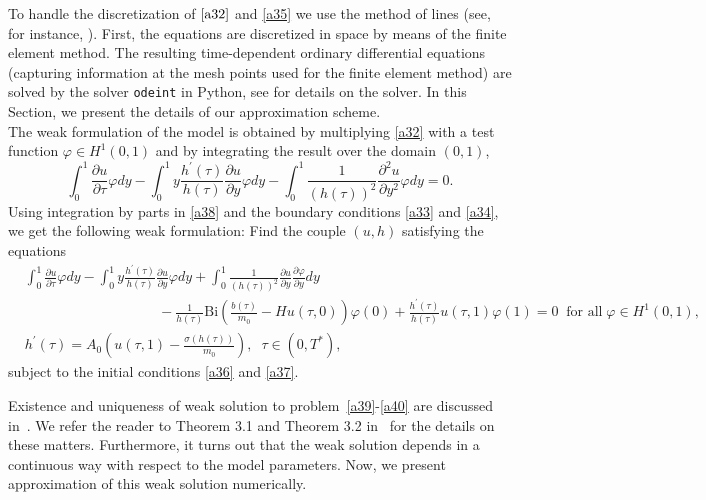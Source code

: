 \documentclass{article}
\begin{document}
To handle  the discretization of $\eqref{a32}$ and \eqref{a35} we use the method of lines (see, for instance, \cite{thomee1984galerkin}). First, the equations are discretized in space by means of the finite element method. The resulting time-dependent ordinary differential equations (capturing information at the mesh points used for the finite element method)  are solved by the solver \texttt{odeint} in Python, see  \cite{johansson2018numerical} for details on the solver. In this Section, we present the details of our approximation scheme.\\
The weak formulation of the model is obtained by multiplying  \eqref{a32} with a test function $\varphi \in H^1(0, 1)$ and by integrating the result over the domain $(0, 1)$,
\begin{equation} 
\label{a38} 
\displaystyle \int_0^1\frac{\partial u}{\partial \tau} \varphi  dy- \int_0^1 y \frac{h^{\prime}(\tau)}{ h(\tau)}\frac{\partial u}{\partial y}\varphi  dy- \int_0^1\frac{1}{(h(\tau))^2}\frac{\partial^2{u}}{\partial{y^2}}\varphi dy  = 0.
\end{equation}
Using integration by parts  in \eqref{a38}  and  the boundary conditions  \eqref{a33} and \eqref{a34}, we get the following weak formulation: Find  the couple $(u, h)$ satisfying the equations 
\begin{align}
\nonumber&\displaystyle \int_0^1 \frac{\partial u}{\partial \tau} \varphi  dy- \int_0^1 y \frac{h^{\prime}(\tau)}{h(\tau)}\frac{\partial u}{\partial y} \varphi  dy +  \int_0^1\frac{1}{(h(\tau))^2}\frac{\partial{u}}{\partial{y}}\frac{\partial \varphi }{\partial y}  dy\\
\label{a39}&\hspace{4cm} - \frac{1}{h(\tau)} \text{Bi}\left(\frac{b(\tau)}{m_{0}}- Hu(\tau, 0)\right)\varphi(0) +\frac{h^{\prime}(\tau)}{h(\tau)}u(\tau, 1)\varphi (1) = 0 \;\;\text{for all} \; \varphi \in H^1(0,1),\\
& \label{a40} h^{\prime}(\tau) =A_0\left(u(\tau, 1)-\frac{\sigma(h(\tau))}{m_{0}}\right),\;\; \tau\in(0, T^*),
\end{align}
subject to the initial conditions \eqref{a36} and \eqref{a37}.


Existence and uniqueness of weak solution to problem~\eqref{a39}-\eqref{a40} are discussed in~\cite{kumazaki2020global}.  We refer the reader to Theorem 3.1 and Theorem 3.2 in~\cite{kumazaki2020global} for the details on these matters.  Furthermore, it turns out that the weak solution depends in a continuous way with respect to the model parameters. Now, we present approximation of this weak solution numerically.
\end{document}
